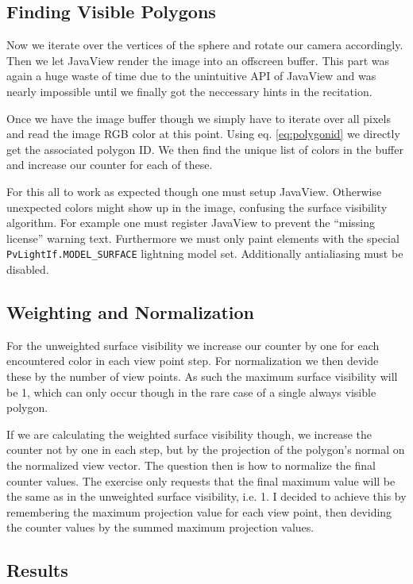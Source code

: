 \documentclass[a4paper,10pt,notitlepage]{scrreprt}
\begin{document}
\subsection{Finding Visible Polygons}

Now we iterate over the vertices of the sphere and rotate our camera
accordingly. Then we let JavaView render the image into an offscreen buffer.
This part was again a huge waste of time due to the unintuitive API of JavaView
and was nearly impossible until we finally got the neccessary hints in the
recitation.

Once we have the image buffer though we simply have to iterate over all pixels
and read the image RGB color at this point. Using eq. \ref{eq:polygonid} we
directly get the associated polygon ID. We then find the unique list of colors
in the buffer and increase our counter for each of these.

For this all to work as expected though one must setup JavaView. Otherwise
unexpected colors might show up in the image, confusing the surface visibility
algorithm. For example one must register JavaView to prevent the ``missing
license'' warning text. Furthermore we must only paint elements with the special
\texttt{PvLightIf.MODEL\_SURFACE} lightning model set. Additionally antialiasing
must be disabled.

\subsection{Weighting and Normalization}

For the unweighted surface visibility we increase our counter by one for each
encountered color in each view point step. For normalization we then devide
these by the number of view points. As such the maximum surface visibility will
be 1, which can only occur though in the rare case of a single always
visible polygon.

If we are calculating the weighted surface visibility though, we increase the
counter not by one in each step, but by the projection of the polygon's normal
on the normalized view vector. The question then is how to normalize the final
counter values. The exercise only requests that the final maximum value will be
the same as in the unweighted surface visibility, i.e. 1. I decided to achieve
this by remembering the maximum projection value for each view point, then
deviding the counter values by the summed maximum projection values.

\subsection{Results}
\end{document}
